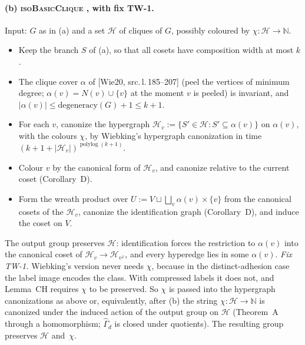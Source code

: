 \documentclass[11pt]{article}
\theoremstyle{plain}
\theoremstyle{definition}
\theoremstyle{remark}
\theoremstyle{named}
\theoremstyle{namedrm}
\newcommand{\polylog}{\operatorname{polylog}}
\newcommand{\Gd}{\widehat{\Gamma}_d}
\newcommand{\src}[2]{[#1, src.\,l.\,#2]}
\begin{document}
\paragraph{(b) \textsc{isoBasicClique} \cite[Lemma~33]{Wie20}, with fix TW-1.} Input: $G$ as in (a) and a
set $\mathcal H$ of cliques of $G$, possibly coloured by $\chi\colon\mathcal H\to\mathbb N$.
\begin{itemize}
\item Keep the branch $S$ of (a), so that all cosets have composition width at most $k$.
\item The clique cover $\alpha$ of \src{Wie20}{185--207} (peel the vertices of minimum degree; $\alpha(v)=N(v)\cup\{v\}$
  at the moment $v$ is peeled) is invariant, and $|\alpha(v)|\le\mathrm{degeneracy}(G)+1\le k+1$.
\item For each $v$, canonize the hypergraph $\mathcal H_v:=\{S'\in\mathcal H:S'\subseteq\alpha(v)\}$ on $\alpha(v)$, with the
  colours $\chi$, by Wiebking's hypergraph canonization \cite[Thm.~9]{Wie20} in time
  $(k+1+|\mathcal H_v|)^{\polylog(k+1)}$.
\item Colour $v$ by the canonical form of $\mathcal H_v$, and canonize relative to the current coset
  (Corollary~D).
\item Form the wreath product over $U:=V\sqcup\bigsqcup_v\alpha(v)\times\{v\}$ from the canonical cosets of the
  $\mathcal H_v$, canonize the identification graph (Corollary~D), and induce the coset on $V$.
\end{itemize}
The output group preserves $\mathcal H$: identification forces the restriction to $\alpha(v)$ into the canonical coset of
$\mathcal H_v\to\mathcal H_{v^\varphi}$, and every hyperedge lies in some $\alpha(v)$.
\emph{Fix TW-1.} Wiebking's version never needs $\chi$, because in the distinct-adhesion case the label
image encodes the class. With compressed labels it does not, and Lemma~CH requires $\chi$ to be preserved.
So $\chi$ is passed into the hypergraph canonizations as above or, equivalently, after (b) the string
$\chi\colon\mathcal H\to\mathbb N$ is canonized under the induced action of the output group on $\mathcal H$ (Theorem~A
through a homomorphism; $\Gd$ is closed under quotients). The resulting group preserves $\mathcal H$ and~$\chi$.
\end{document}
